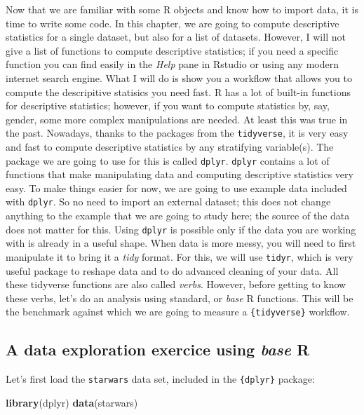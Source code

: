 \documentclass[]{gitbook}
\newenvironment{Shaded}{\begin{snugshade}}{\end{snugshade}}
\newcommand{\KeywordTok}[1]{\textcolor[rgb]{0.13,0.29,0.53}{\textbf{#1}}}
\newcommand{\NormalTok}[1]{#1}
\theoremstyle{definition}
\theoremstyle{definition}
\theoremstyle{definition}
\theoremstyle{remark}
\begin{document}
Now that we are familiar with some R objects and know how to import
data, it is time to write some code. In this chapter, we are going to
compute descriptive statistics for a single dataset, but also for a list
of datasets. However, I will not give a list of functions to compute
descriptive statistics; if you need a specific function you can find
easily in the \emph{Help} pane in Rstudio or using any modern internet
search engine. What I will do is show you a workflow that allows you to
compute the descripitive statisics you need fast. R has a lot of
built-in functions for descriptive statistics; however, if you want to
compute statistics by, say, gender, some more complex manipulations are
needed. At least this was true in the past. Nowadays, thanks to the
packages from the \texttt{tidyverse}, it is very easy and fast to
compute descriptive statistics by any stratifying variable(s). The
package we are going to use for this is called \texttt{dplyr}.
\texttt{dplyr} contains a lot of functions that make manipulating data
and computing descriptive statistics very easy. To make things easier
for now, we are going to use example data included with \texttt{dplyr}.
So no need to import an external dataset; this does not change anything
to the example that we are going to study here; the source of the data
does not matter for this. Using \texttt{dplyr} is possible only if the
data you are working with is already in a useful shape. When data is
more messy, you will need to first manipulate it to bring it a
\emph{tidy} format. For this, we will use \texttt{tidyr}, which is very
useful package to reshape data and to do advanced cleaning of your data.
All these tidyverse functions are also called \emph{verbs}. However,
before getting to know these verbs, let's do an analysis using standard,
or \emph{base} R functions. This will be the benchmark against which we
are going to measure a \texttt{\{tidyverse\}} workflow.

\hypertarget{a-data-exploration-exercice-using-base-r}{%
\subsection{\texorpdfstring{A data exploration exercice using
\emph{base}
R}{A data exploration exercice using base R}}\label{a-data-exploration-exercice-using-base-r}}

Let's first load the \texttt{starwars} data set, included in the
\texttt{\{dplyr\}} package:

\begin{Shaded}
\begin{Highlighting}[]
\KeywordTok{library}\NormalTok{(dplyr)}
\KeywordTok{data}\NormalTok{(starwars)}
\end{Highlighting}
\end{Shaded}
\end{document}
